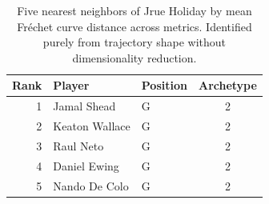 \begin{table}[htbp]
  \centering\small
  \begin{tabular}{rllc}
    \toprule
    Rank & Player & Position & Archetype \\
    \midrule
    1 & Jamal Shead & G & 2 \\
    2 & Keaton Wallace & G & 2 \\
    3 & Raul Neto & G & 2 \\
    4 & Daniel Ewing & G & 2 \\
    5 & Nando De Colo & G & 2 \\
    \bottomrule
  \end{tabular}
  \caption{Five nearest neighbors of Jrue Holiday by mean Fr\'{e}chet curve distance across metrics. Identified purely from trajectory shape without dimensionality reduction.}
  \label{tab:Jrue_Holiday_frechet_curve_neighbors}
\end{table}

